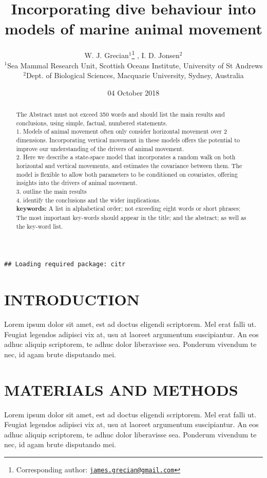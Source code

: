 \documentclass[12pt,]{article}
\title{Incorporating dive behaviour into models of marine animal movement}
\author{W. J. Grecian\(^1\)\footnote{Corresponding author:
  \href{mailto:james.grecian@gmail.com}{\nolinkurl{james.grecian@gmail.com}}}
, I. D. Jonsen\(^2\)\\
\(^1\)Sea Mammal Research Unit, Scottish Oceans Institute, University of
St Andrews\\
\(^2\)Dept. of Biological Sciences, Macquarie University, Sydney,
Australia}
\date{04 October 2018}
\begin{document}
\maketitle
\begin{abstract}
The Abstract must not exceed 350 words and should list the main results
and conclusions, using simple, factual, numbered statements.\\
1. Models of animal movement often only consider horizontal movement
over 2 dimensions. Incorporating vertical movement in these models
offers the potential to improve our understanding of the drivers of
animal movement.\\
2. Here we describe a state-space model that incorporates a random walk
on both horizontal and vertical movements, and estimates the covariance
between them. The model is flexible to allow both parameters to be
conditioned on covariates, offering insights into the drivers of animal
movement.\\
3. outline the main results\\
4. identify the conclusions and the wider implications.\\
\textbf{keywords:} A list in alphabetical order; not exceeding eight
words or short phrases; The most important key-words should appear in
the title; and the abstract; as well as the key-word list.
\end{abstract}

\begin{verbatim}
## Loading required package: citr
\end{verbatim}

\section{INTRODUCTION}\label{introduction}

Lorem ipsum dolor sit amet, est ad doctus eligendi scriptorem. Mel erat
falli ut. Feugiat legendos adipisci vix at, usu at laoreet argumentum
suscipiantur. An eos adhuc aliquip scriptorem, te adhuc dolor
liberavisse sea. Ponderum vivendum te nec, id agam brute disputando mei.

\section{MATERIALS AND METHODS}\label{materials-and-methods}

Lorem ipsum dolor sit amet, est ad doctus eligendi scriptorem. Mel erat
falli ut. Feugiat legendos adipisci vix at, usu at laoreet argumentum
suscipiantur. An eos adhuc aliquip scriptorem, te adhuc dolor
liberavisse sea. Ponderum vivendum te nec, id agam brute disputando mei.
\end{document}
